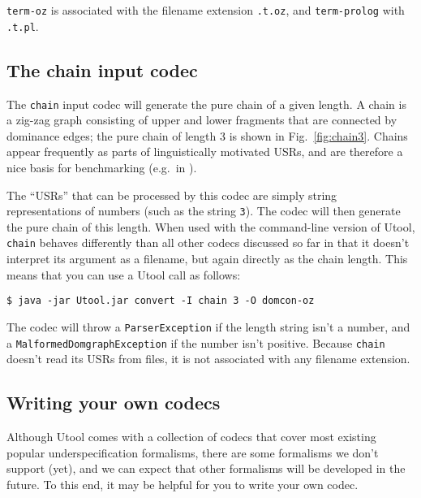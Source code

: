 \verb?term-oz? is associated with the filename extension \verb?.t.oz?, and
\verb?term-prolog? with \verb?.t.pl?.





\subsection{The chain input codec}

The \verb?chain? input codec will generate the pure chain
\cite{Koller04} of a given length. A chain is a zig-zag graph
consisting of upper and lower fragments that are connected by
dominance edges; the pure chain of length 3 is shown in
Fig.~\ref{fig:chain3}. Chains appear frequently as parts of
linguistically motivated USRs, and are therefore a nice basis for
benchmarking (e.g.\ in \cite{bodirsky-weakly-normal-constraints}).

The ``USRs'' that can be processed by this codec are simply string
representations of numbers (such as the string \verb?3?). The codec
will then generate the pure chain of this length. When used with the
command-line version of Utool, \verb?chain? behaves differently than
all other codecs discussed so far in that it doesn't interpret its
argument as a filename, but again directly as the chain length. This
means that you can use a Utool call as follows:

\begin{verbatim}
$ java -jar Utool.jar convert -I chain 3 -O domcon-oz
\end{verbatim}

The codec will throw a \verb?ParserException? if the length string
isn't a number, and a \verb?MalformedDomgraphException? if the number
isn't positive. Because \verb?chain? doesn't read its USRs from files,
it is not associated with any filename extension.






\subsection{Writing your own codecs}

Although Utool comes with a collection of codecs that cover most
existing popular underspecification formalisms, there are some
formalisms we don't support (yet), and we can expect that other
formalisms will be developed in the future. To this end, it may be
helpful for you to write your own codec.

